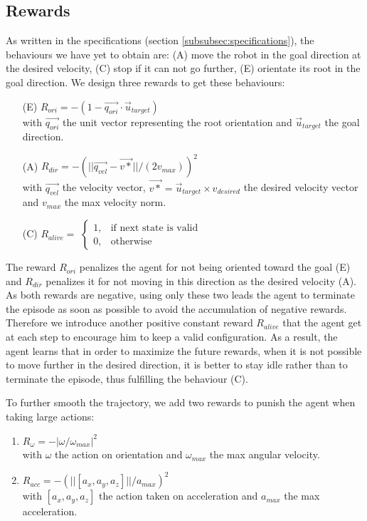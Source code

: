 \subsection{Rewards}
As written in the specifications (section \ref{subsubsec:specifications}), the behaviours we have yet to obtain are: (A) move the robot in the goal direction at the desired velocity, (C) stop if it can not go further, (E) orientate its root in the goal direction. 
We design three rewards to get these behaviours:
\begin{enumerate}
  \item[(E)] $R_{ori} = -( 1 -  \overrightarrow{q_{ori}} \cdot \overrightarrow{u}_{target} )$ \\
  with $\overrightarrow{q_{ori}}$ the unit vector representing the root orientation and $\overrightarrow{u}_{target}$ the goal direction.
  \item[(A)] $R_{dir} = -( ||\overrightarrow{q_{vel}} - \overrightarrow{v*} ||/(2v_{max}) )^2$ \\
  with $\overrightarrow{q_{vel}}$ the velocity vector, $\overrightarrow{v*}=\overrightarrow{u}_{target} \times v_{desired}$ the desired velocity vector and $v_{max}$ the max velocity norm.
  \item[(C)] $R_{alive} = $ 
    $
    \begin{cases}
      1, & \text{if next state is valid} \\
      0, & \text{otherwise}
    \end{cases}
    $
\end{enumerate}
The reward $R_{ori}$ penalizes the agent for not being oriented toward the goal (E) and $R_{dir}$ penalizes it for not moving in this direction as the desired velocity (A). 
As both rewards are negative, using only these two leads the agent to terminate the episode as soon as possible to avoid the accumulation of negative rewards. 
Therefore we introduce another positive constant reward $R_{alive}$ that the agent get at each step to encourage him to keep a valid configuration. 
As a result, the agent learns that in order to maximize the future rewards, when it is not possible to move further in the desired direction, it is better to stay idle rather than to terminate the episode, thus fulfilling the behaviour (C).

To further smooth the trajectory, we add two rewards to punish the agent when taking large actions:
\begin{enumerate}
    \item $R_{\omega} = - | \omega / \omega_{max} |^2 $ \\
    with $\omega$ the action on orientation and $\omega_{max}$ the max angular velocity.
    \item $R_{acc} = - (|| [a_{x},a_{y},a_{z}] || / a_{max})^2 $ \\
    with $[a_{x},a_{y},a_{z}]$ the action taken on acceleration and $a_{max}$ the max acceleration.
\end{enumerate}

